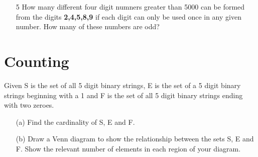 \documentclass[12pt]{report}
\begin{document}
{\begin{itemize}
	\item[5] How many different four digit numners greater than 5000 can be formed from the digits \textbf{2,4,5,8,9} if each digit can only be used once in any given number. How many of these numbers are odd?
\end{itemize}

\section{Counting}
Given S is the set of all 5 digit binary strings, E is the set of a 5 digit
binary strings beginning with a 1 and F is the set of all 5 digit binary strings ending
with two zeroes.
\begin{itemize}
	\item[(a)] Find the cardinality of S, E and F.
	\item[(b)] Draw a Venn diagram to show the relationship between the sets S, E and F.
	Show the relevant number of elements in each region of your diagram.
\end{itemize}


}
\end{document}
